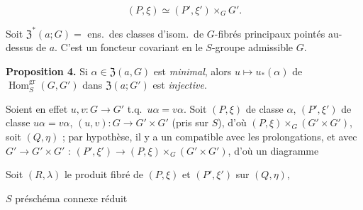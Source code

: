 \documentclass[11pt,a4paper]{article}
\begin{document}
\[ (P, \xi) \simeq (P', \xi') \times_{G} G'. \]



 Soit $\mathfrak{Z}^{*}(a ; G) = $ ens.\ des classes d'isom.\ de
$G$-fibrés principaux  pointés au-dessus de $a$. C'est un
foncteur covariant en le $S$-groupe admissible $G$.

\textbf{Proposition 4.} Si $\alpha \in \mathfrak{Z}(a, G)$ est \emph{minimal},
alors $u \mapsto u_{*}(\alpha)$ de $\operatorname{Hom}^{\mathrm{gr}}_{S}(G,
G')$ dans  $\mathfrak{Z}(a ; G')$ est \emph{injective}.

Soient en effet $u, v : G \to G'$ t.q.\ $u\alpha = v\alpha$. Soit $(P, \xi)$ de
classe $\alpha$, $(P', \xi')$ de classe $u\alpha = v\alpha$, $(u,v) : G \to G' \times G'$ (pris sur $S$), d'où $(P, \xi) \times_{G} (G'
\times G')$, soit $(Q, \eta)$ ; par hypothèse, il y a un  compatible avec
les prolongations, et avec  $G' \to G' \times G'$ : $(P',
\xi') \to (P, \xi) \times_{G} (G' \times G')$, d'où un diagramme




Soit $(R, \lambda)$ le produit fibré de $(P, \xi)$ et $(P', \xi')$ sur $(Q,
\eta)$,


$S$ préschéma connexe réduit

 
\end{document}
